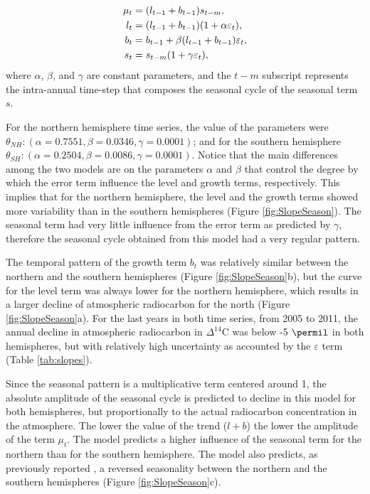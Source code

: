 \begin{align}
\mu_t &= (l_{t-1} + b_{t-1}) s_{t-m}, \notag \\
l_t &= (l_{t-1} + b_{t-1}) (1 + \alpha \varepsilon_t), \notag \\
b_t &= b_{t-1} + \beta (l_{t-1} + b_{t-1})\varepsilon_t , \notag \\
s_t &= s_{t-m} (1+ \gamma \varepsilon_t), \notag
\end{align}
where $\alpha$, $\beta$, and $\gamma$ are constant parameters, and  the $t-m$ subscript represents the intra-annual time-step that composes the seasonal cycle of the seasonal term $s$. 

For the northern hemisphere time series, the value of the parameters were $\theta_{NH}: (\alpha = 0.7551, \beta = 0.0346, \gamma = 0.0001)$; and for the southern hemisphere $\theta_{SH} : (\alpha = 0.2504, \beta = 0.0086, \gamma = 0.0001)$. Notice that the main differences among the two models are on the parameters $\alpha$ and $\beta$ that control the degree by which the error term influence the level and growth terms, respectively. This implies that for the northern hemisphere, the level and the growth terms showed more variability than in the southern hemispheres (Figure \ref{fig:SlopeSeason}). The seasonal term had very little influence from the error term as predicted by  $\gamma$, therefore the seasonal cycle obtained from this model had a very regular pattern. 

The temporal pattern of the growth term $b_t$ was relatively similar between the northern and the southern hemispheres (Figure \ref{fig:SlopeSeason}b), but the curve for the level term was always lower for the northern hemisphere, which results in a larger decline of atmospheric radiocarbon for the north (Figure \ref{fig:SlopeSeason}a). For the last years in both time series, from 2005 to 2011,
the annual decline in atmospheric radiocarbon in $\Delta^{14}$C was below -5 $\permil$ in both hemispheres, but with relatively high uncertainty  as  accounted by the $\varepsilon$ term (Table \ref{tab:slopes}).


Since the seasonal pattern is a multiplicative term centered around 1, the absolute amplitude of the seasonal cycle is predicted to decline in this model for both hemispheres, but proportionally to the actual radiocarbon concentration in the atmosphere. The lower the value of the trend ($l + b$) the lower the amplitude of the term $\mu_t$. The model predicts a higher influence of the seasonal term for the northern than for the southern hemisphere.
The model also predicts, as previously reported \citep{Levin2010Tellus, Currie2011}, a reversed seasonality between the northern and the southern hemispheres (Figure \ref{fig:SlopeSeason}c). 

